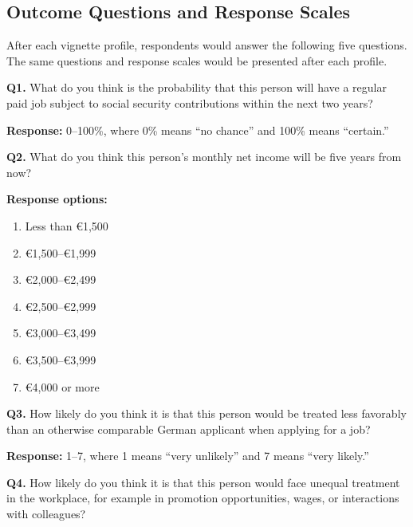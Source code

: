 \subsection{Outcome Questions and Response Scales}
\label{app:outcomes}

After each vignette profile, respondents would answer the following five questions.
The same questions and response scales would be presented after each profile.

\medskip

\noindent\textbf{Q1.}
What do you think is the probability that this person will have a regular paid job
subject to social security contributions within the next two years?

\smallskip

\noindent
\textbf{Response:} 0--100\%, where 0\% means ``no chance'' and 100\% means
``certain.''

\medskip

\noindent\textbf{Q2.}
What do you think this person's monthly net income will be five years from now?

\smallskip

\noindent
\textbf{Response options:}
\begin{enumerate}
    \item Less than €1,500
    \item €1,500--€1,999
    \item €2,000--€2,499
    \item €2,500--€2,999
    \item €3,000--€3,499
    \item €3,500--€3,999
    \item €4,000 or more
\end{enumerate}

\medskip

\noindent\textbf{Q3.}
How likely do you think it is that this person would be treated less favorably
than an otherwise comparable German applicant when applying for a job?

\smallskip

\noindent
\textbf{Response:} 1--7, where 1 means ``very unlikely'' and 7 means
``very likely.''

\medskip

\noindent\textbf{Q4.}
How likely do you think it is that this person would face unequal treatment in the workplace, 
for example in promotion opportunities, wages, or interactions with colleagues? 

\smallskip

